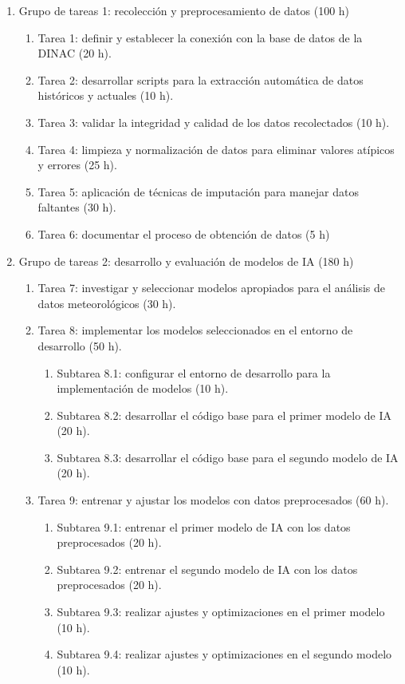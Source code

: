 \documentclass[
11pt, %
codirector, %
]{charter}
\begin{document}
\begin{enumerate}
\item Grupo de tareas 1: recolección y preprocesamiento de datos (100 h)
	\begin{enumerate}
	\item Tarea 1: definir y establecer la conexión con la base de datos de la DINAC (20 h).
	\item Tarea 2: desarrollar scripts para la extracción automática de datos históricos y actuales (10 h).
	\item Tarea 3: validar la integridad y calidad de los datos recolectados (10 h).
	\item Tarea 4: limpieza y normalización de datos para eliminar valores atípicos y errores (25 h).
	\item Tarea 5: aplicación de técnicas de imputación para manejar datos faltantes (30 h).
	\item Tarea 6: documentar el proceso de obtención de datos (5 h)
	\end{enumerate}
\item Grupo de tareas 2: desarrollo y evaluación de modelos de IA (180 h)
	\begin{enumerate}
	\item Tarea 7: investigar y seleccionar modelos apropiados para el análisis de datos meteorológicos (30 h).
	\item Tarea 8: implementar los modelos seleccionados en el entorno de desarrollo (50 h).
	\begin{enumerate}
	\item Subtarea 8.1: configurar el entorno de desarrollo para la implementación de modelos (10 h).	
	\item Subtarea 8.2: desarrollar el código base para el primer modelo de IA (20 h).
	\item Subtarea 8.3: desarrollar el código base para el segundo modelo de IA (20 h).
	\end{enumerate}		
	\item Tarea 9: entrenar y ajustar los modelos con datos preprocesados (60 h).
	\begin{enumerate}
	\item Subtarea 9.1: entrenar el primer modelo de IA con los datos preprocesados (20 h).
	\item Subtarea 9.2: entrenar el segundo modelo de IA con los datos preprocesados (20 h).
	\item Subtarea 9.3: realizar ajustes y optimizaciones en el primer modelo (10 h).
	\item Subtarea 9.4: realizar ajustes y optimizaciones en el segundo modelo (10 h).

\end{enumerate}
\end{enumerate}
\end{enumerate}
\end{document}
